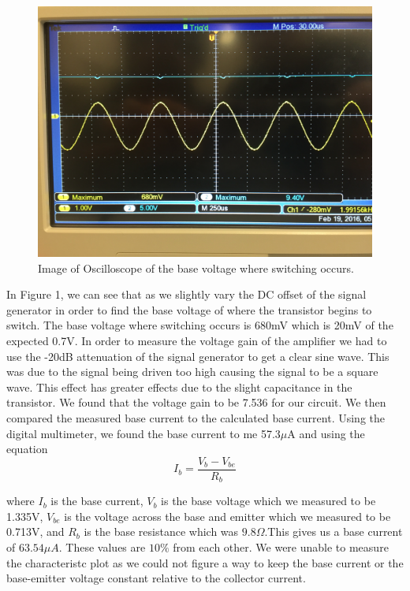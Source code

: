 \documentclass[11pt,letterpaper,onecolumn]{article}
\begin{document}
\begin{figure}[H]
    \centering
    \includegraphics[scale = 0.1]{IMG_1046.JPG}
    \caption{Image of Oscilloscope of the base voltage where switching occurs.}
    \label{fig:prtd}
\end{figure}

In Figure 1, we can see that as we slightly vary the DC offset of the signal generator in order to find the base voltage of where the transistor begins to switch. The base voltage where switching occurs is 680mV which is 20mV of the expected 0.7V. In order to measure the voltage gain of the amplifier we had to use the -20dB attenuation of the signal generator to get a clear sine wave. This was due to the signal being driven too high causing the signal to be a square wave. This effect has greater effects due to the slight capacitance in the transistor. We found that the voltage gain to be 7.536 for our circuit. We then compared the measured base current to the calculated base current. Using the digital multimeter, we found the base current to me 57.3$\mu$A and using the equation   
$$I_b = \frac{V_b-V_{be}}{R_b}$$

where $I_b$ is the base current, $V_b$ is the base voltage which we measured to be 1.335V, $V_{be}$ is the voltage across the base and emitter which we measured to be 0.713V, and $R_b$ is the base resistance which was $9.8\Omega$.This gives us a base current of $63.54\mu A$. These values are $10\%$ from each other. We were unable to measure the characteristc plot as we could not figure a way to keep the base current or the base-emitter voltage constant relative to the collector current. 
\end{document}
